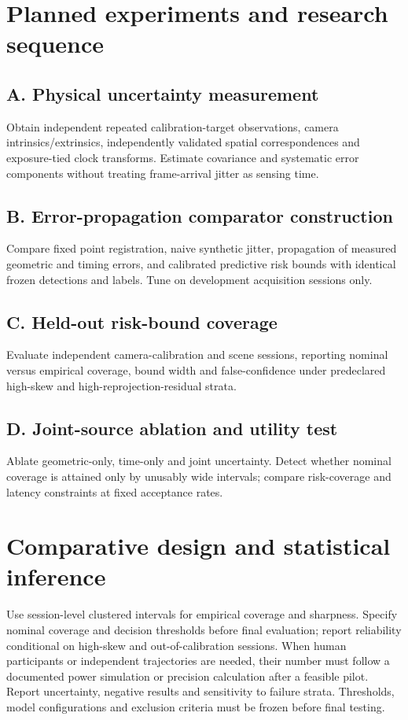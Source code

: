 \documentclass[11pt,a4paper]{article}
\begin{document}
\section{Planned experiments and research sequence}
\subsection{A. Physical uncertainty measurement}
Obtain independent repeated calibration-target observations, camera intrinsics/extrinsics, independently validated spatial correspondences and exposure-tied clock transforms. Estimate covariance and systematic error components without treating frame-arrival jitter as sensing time.

\subsection{B. Error-propagation comparator construction}
Compare fixed point registration, naive synthetic jitter, propagation of measured geometric and timing errors, and calibrated predictive risk bounds with identical frozen detections and labels. Tune on development acquisition sessions only.

\subsection{C. Held-out risk-bound coverage}
Evaluate independent camera-calibration and scene sessions, reporting nominal versus empirical coverage, bound width and false-confidence under predeclared high-skew and high-reprojection-residual strata.

\subsection{D. Joint-source ablation and utility test}
Ablate geometric-only, time-only and joint uncertainty. Detect whether nominal coverage is attained only by unusably wide intervals; compare risk-coverage and latency constraints at fixed acceptance rates.

\section{Comparative design and statistical inference}
Use session-level clustered intervals for empirical coverage and sharpness. Specify nominal coverage and decision thresholds before final evaluation; report reliability conditional on high-skew and out-of-calibration sessions. When human participants or independent trajectories are needed, their number must follow a documented power simulation or precision calculation after a feasible pilot. Report uncertainty, negative results and sensitivity to failure strata. Thresholds, model configurations and exclusion criteria must be frozen before final testing.
\end{document}
